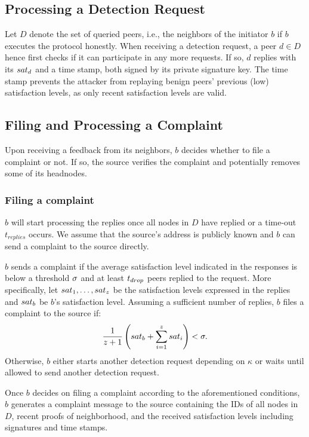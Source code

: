 \subsection{Processing a Detection Request}
Let $D$ denote the set of queried peers, i.e., the neighbors of the initiator $b$ if $b$ executes the protocol honestly.  
When receiving a detection request, a peer $d \in D$ hence first checks if it can participate in any more requests.     
If so, $d$ replies with its $sat_d$ and a time stamp, both signed by its private signature key. 
The time stamp prevents the attacker from replaying benign peers' previous (low) satisfaction levels, as only recent satisfaction levels are valid.


\subsection{Filing and Processing a Complaint}

Upon receiving a feedback from its neighbors, $b$ decides whether to file a complaint or not.
If so, the source verifies the complaint and potentially removes some of its headnodes. 

\subsubsection*{Filing a complaint}
$b$ will start processing the replies once all nodes in $D$ have replied or a time-out $t_{replies}$ occurs. 
We assume that the source's address is publicly known and $b$ can send a complaint to the source directly.

$b$ sends a complaint if the average satisfaction level indicated in the responses is below a threshold $\sigma$ and at least $t_{drop}$ peers replied to the request. 
More specifically, let $sat_1, \ldots ,sat_z$ be the satisfaction levels expressed in the replies and $sat_b$ be $b$'s satisfaction level. 
Assuming a sufficient number of replies, $b$ files a complaint to the source if:
\begin{align}
\label{eq:drop_satis_equation}
\frac{1}{z+1}\left( \sat_b + \sum_{i=1}^{z} \sat_i \right) < \satThres. 
\end{align} 
Otherwise, $b$ either starts another detection request depending on $\kappa$ or waits until allowed to send another detection request.
 

Once $b$ decides on filing a complaint according to the aforementioned conditions, $b$ generates a complaint message to the source containing the IDs of all nodes in $D$, recent proofs of neighborhood,  and the received satisfaction levels including signatures and time stamps.  



